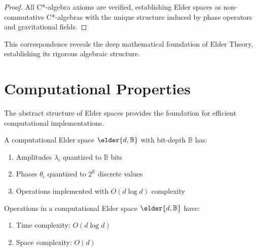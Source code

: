 \begin{proof}
All C*-algebra axioms are verified, establishing Elder spaces as non-commutative C*-algebras with the unique structure induced by phase operators and gravitational fields.
\end{proof}

This correspondence reveals the deep mathematical foundation of Elder Theory, establishing its rigorous algebraic structure.

\section{Computational Properties}

The abstract structure of Elder spaces provides the foundation for efficient computational implementations.

\begin{definition}
A computational Elder space $\elder{d, \mathbb{B}}$ with bit-depth $\mathbb{B}$ has:
\begin{enumerate}
    \item Amplitudes $\lambda_i$ quantized to $\mathbb{B}$ bits
    \item Phases $\theta_i$ quantized to $2^{\mathbb{B}}$ discrete values
    \item Operations implemented with $O(d \log d)$ complexity
\end{enumerate}
\end{definition}

\begin{theorem}
\label{thm:complexity_bounds}
Operations in a computational Elder space $\elder{d, \mathbb{B}}$ have:
\begin{enumerate}
    \item Time complexity: $O(d \log d)$
    \item Space complexity: $O(d)$
\end{enumerate}
\end{theorem}

